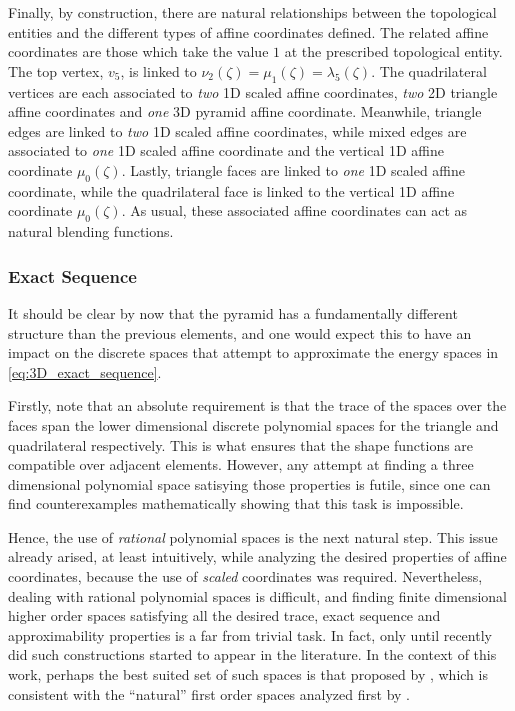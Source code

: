 Finally, by construction, there are natural relationships between the topological entities and the different types of affine coordinates defined.
The related affine coordinates are those which take the value $1$ at the prescribed topological entity.
The top vertex, $v_5$, is linked to $\nu_2(\zeta)=\mu_1(\zeta)=\lambda_5(\zeta)$.
The quadrilateral vertices are each associated to \textit{two} 1D scaled affine coordinates, \textit{two} 2D triangle affine coordinates and \textit{one} 3D pyramid affine coordinate.
Meanwhile, triangle edges are linked to \textit{two} 1D scaled affine coordinates, while mixed edges are associated to \textit{one} 1D scaled affine coordinate and the vertical 1D affine coordinate $\mu_0(\zeta)$.
Lastly, triangle faces are linked to \textit{one} 1D scaled affine coordinate, while the quadrilateral face is linked to the vertical 1D affine coordinate $\mu_0(\zeta)$.
As usual, these associated affine coordinates can act as natural blending functions.

\subsubsection*{Exact Sequence}

It should be clear by now that the pyramid has a fundamentally different structure than the previous elements, and one would expect this to have an impact on the discrete spaces that attempt to approximate the energy spaces in \eqref{eq:3D_exact_sequence}.

Firstly, note that an absolute requirement is that the trace of the spaces over the faces span the lower dimensional discrete polynomial spaces for the triangle and quadrilateral respectively.
This is what ensures that the shape functions are compatible over adjacent elements.
However, any attempt at finding a three dimensional polynomial space satisying those properties is futile, since one can find counterexamples mathematically showing that this task is impossible.

Hence, the use of \textit{rational} polynomial spaces is the next natural step.
This issue already arised, at least intuitively, while analyzing the desired properties of affine coordinates, because the use of \textit{scaled} coordinates was required.
Nevertheless, dealing with rational polynomial spaces is difficult, and finding finite dimensional higher order spaces satisfying all the desired trace, exact sequence and approximability properties is a far from trivial task.
In fact, only until recently did such constructions started to appear in the literature.
In the context of this work, perhaps the best suited set of such spaces is that proposed by \citet{Nigam_Phillips_11}, which is consistent with the ``natural'' first order spaces analyzed first by \citet{Hiptmair99}.

